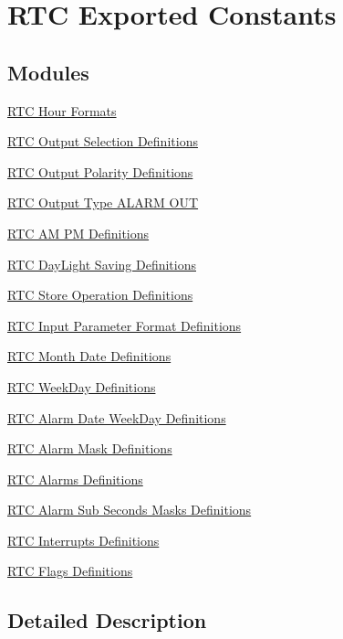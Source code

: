 \hypertarget{group___r_t_c___exported___constants}{}\section{R\+TC Exported Constants}
\label{group___r_t_c___exported___constants}
\subsection*{Modules}
\begin{DoxyCompactItemize}
\item 
\hyperlink{group___r_t_c___hour___formats}{R\+T\+C Hour Formats}
\item 
\hyperlink{group___r_t_c___output__selection___definitions}{R\+T\+C Output Selection Definitions}
\item 
\hyperlink{group___r_t_c___output___polarity___definitions}{R\+T\+C Output Polarity Definitions}
\item 
\hyperlink{group___r_t_c___output___type___a_l_a_r_m___o_u_t}{R\+T\+C Output Type A\+L\+A\+R\+M O\+UT}
\item 
\hyperlink{group___r_t_c___a_m___p_m___definitions}{R\+T\+C A\+M P\+M Definitions}
\item 
\hyperlink{group___r_t_c___day_light_saving___definitions}{R\+T\+C Day\+Light Saving Definitions}
\item 
\hyperlink{group___r_t_c___store_operation___definitions}{R\+T\+C Store Operation Definitions}
\item 
\hyperlink{group___r_t_c___input__parameter__format__definitions}{R\+T\+C Input Parameter Format Definitions}
\item 
\hyperlink{group___r_t_c___month___date___definitions}{R\+T\+C Month Date Definitions}
\item 
\hyperlink{group___r_t_c___week_day___definitions}{R\+T\+C Week\+Day Definitions}
\item 
\hyperlink{group___r_t_c___alarm_date_week_day___definitions}{R\+T\+C Alarm Date Week\+Day Definitions}
\item 
\hyperlink{group___r_t_c___alarm_mask___definitions}{R\+T\+C Alarm Mask Definitions}
\item 
\hyperlink{group___r_t_c___alarms___definitions}{R\+T\+C Alarms Definitions}
\item 
\hyperlink{group___r_t_c___alarm___sub___seconds___masks___definitions}{R\+T\+C Alarm Sub Seconds Masks Definitions}
\item 
\hyperlink{group___r_t_c___interrupts___definitions}{R\+T\+C Interrupts Definitions}
\item 
\hyperlink{group___r_t_c___flags___definitions}{R\+T\+C Flags Definitions}
\end{DoxyCompactItemize}


\subsection{Detailed Description}
